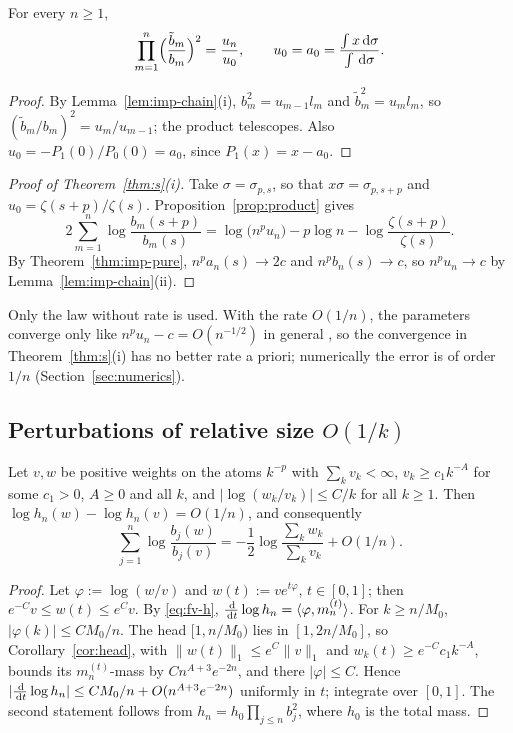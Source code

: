 \begin{proposition}\label{prop:product}
For every $n\ge1$,
\[
  \prod_{m=1}^n\Bigl(\frac{\tilde b_m}{b_m}\Bigr)^2=\frac{u_n}{u_0},\qquad u_0=a_0=\frac{\int x\,\mathrm{d}\sigma}{\int\,\mathrm{d}\sigma}.
\]
\end{proposition}

\begin{proof}
By Lemma~\ref{lem:imp-chain}(i), $b_m^2=u_{m-1}l_m$ and $\tilde b_m^2=u_ml_m$, so $(\tilde b_m/b_m)^2=u_m/u_{m-1}$;
the product telescopes. Also $u_0=-P_1(0)/P_0(0)=a_0$, since $P_1(x)=x-a_0$.
\end{proof}

\begin{proof}[Proof of Theorem~\ref{thm:s}\textup{(i)}]
Take $\sigma=\sigma_{p,s}$, so that $x\sigma=\sigma_{p,s+p}$ and $u_0=\zeta(s+p)/\zeta(s)$. Proposition~\ref{prop:product}
gives
\[
  2\sum_{m=1}^n\log\frac{b_m(s+p)}{b_m(s)}=\log\bigl(n^pu_n\bigr)-p\log n-\log\frac{\zeta(s+p)}{\zeta(s)} .
\]
By Theorem~\ref{thm:imp-pure}, $n^pa_n(s)\to2c$ and $n^pb_n(s)\to c$, so $n^pu_n\to c$ by
Lemma~\ref{lem:imp-chain}(ii).
\end{proof}

Only the law without rate is used. With the rate $O(1/n)$, the parameters converge only like
$n^pu_n-c=O(n^{-1/2})$ in general \cite[Lemma~3.5 and Remark~3.6]{PaperII}, so the convergence in Theorem~\ref{thm:s}(i) has no
better rate a priori; numerically the error is of order $1/n$ (Section~\ref{sec:numerics}).

\subsection{Perturbations of relative size \texorpdfstring{$O(1/k)$}{O(1/k)}}

\begin{proposition}\label{prop:oneoverk}
Let $v,w$ be positive weights on the atoms $k^{-p}$ with $\sum_kv_k<\infty$, $v_k\ge c_1k^{-A}$ for some $c_1>0$,
$A\ge0$ and all $k$, and $|\log(w_k/v_k)|\le C/k$ for all $k\ge1$. Then $\log h_n(w)-\log h_n(v)=O(1/n)$, and
consequently
\[
  \sum_{j=1}^n\log\frac{b_j(w)}{b_j(v)}=-\frac12\log\frac{\sum_kw_k}{\sum_kv_k}+O(1/n).
\]
\end{proposition}

\begin{proof}
Let $\varphi:=\log(w/v)$ and $w(t):=ve^{t\varphi}$, $t\in[0,1]$; then $e^{-C}v\le w(t)\le e^Cv$. By \eqref{eq:fv-h},
$\frac{\,\mathrm{d}}{\,\mathrm{d} t}\log h_n=\langle\varphi,m^{(t)}_n\rangle$. For $k\ge n/M_0$, $|\varphi(k)|\le CM_0/n$. The head
$[1,n/M_0)$ lies in $[1,2n/M_0]$, so Corollary~\ref{cor:head}, with $\|w(t)\|_1\le e^C\|v\|_1$ and $w_k(t)\ge
e^{-C}c_1k^{-A}$, bounds its $m^{(t)}_n$-mass by $Cn^{A+3}e^{-2n}$, and there $|\varphi|\le C$. Hence
$|\frac{\,\mathrm{d}}{\,\mathrm{d} t}\log h_n|\le CM_0/n+O(n^{A+3}e^{-2n})$ uniformly in $t$; integrate over $[0,1]$. The second
statement follows from $h_n=h_0\prod_{j\le n}b_j^2$, where $h_0$ is the total mass.
\end{proof}

